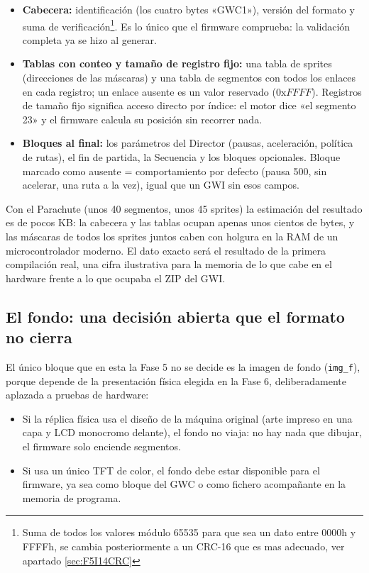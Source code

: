 \begin{itemize}
	\item \textbf{Cabecera:} identificación (los cuatro bytes
	«GWC1»), versión del formato y suma de verificación\footnote{Suma de todos los valores módulo 65535 para que sea un dato entre 0000h y FFFFh, se cambia posteriormente a un CRC-16 que es mas adecuado, ver apartado \ref{sec:F5I14CRC}}. Es lo único
	que el firmware comprueba: la validación completa ya se hizo al
	generar.
	\item \textbf{Tablas con conteo y tamaño de registro fijo:} una
	tabla de sprites (direcciones de las máscaras) y una tabla de
	segmentos con todos los enlaces en cada registro; un enlace ausente
	es un valor reservado ($0\text{x}FFFF$). Registros de tamaño fijo
	significa acceso directo por índice: el motor dice «el segmento 23»
	y el firmware calcula su posición sin recorrer nada.
	\item \textbf{Bloques al final:} los parámetros del Director
	(pausas, aceleración, política de rutas), el fin de partida, la
	Secuencia y los bloques opcionales. Bloque marcado como ausente =
	comportamiento por defecto (pausa 500, sin acelerar, una ruta a la
	vez), igual que un GWI sin esos campos.
\end{itemize}

Con el Parachute (unos 40 segmentos, unos 45 sprites) la estimación
del resultado es de pocos KB: la cabecera y las tablas ocupan
apenas unos cientos de bytes, y las máscaras de todos los sprites
juntos caben con holgura en la RAM de un microcontrolador moderno.
El dato exacto será el resultado de la primera compilación real,
una cifra ilustrativa para la memoria de lo que cabe en el hardware
frente a lo que ocupaba el ZIP del GWI.

\subsection{El fondo: una decisión abierta que el formato no cierra}
\label{sec:F5Fondo}

El único bloque que en esta la Fase 5 no se decide es la imagen de
fondo (\texttt{img\_f}), porque depende de la presentación física
elegida en la Fase 6, deliberadamente aplazada a pruebas de
hardware:

\begin{itemize}
	\item Si la réplica física usa el diseño de la máquina original
	(arte impreso en una capa y LCD monocromo delante), el fondo no
	viaja: no hay nada que dibujar, el firmware solo enciende segmentos.
	\item Si usa un único TFT de color, el fondo debe estar disponible
	para el firmware, ya sea como bloque del GWC o como fichero
	acompañante en la memoria de programa.
\end{itemize}

